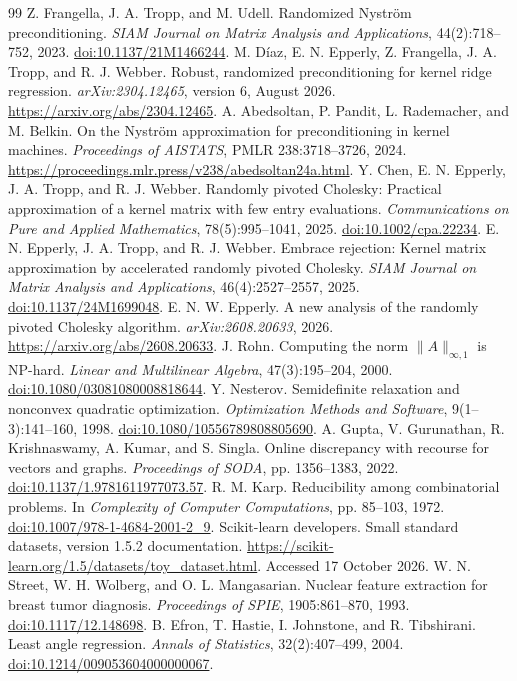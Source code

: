 \documentclass[11pt]{article}
\theoremstyle{definition}\newtheorem{definition}[theorem]{Definition}
\begin{document}
\begin{thebibliography}{99}
 Z. Frangella, J. A. Tropp, and M. Udell. Randomized Nystr\"om preconditioning. \emph{SIAM Journal on Matrix Analysis and Applications}, 44(2):718--752, 2023. \href{https://doi.org/10.1137/21M1466244}{doi:10.1137/21M1466244}.
 M. D\'iaz, E. N. Epperly, Z. Frangella, J. A. Tropp, and R. J. Webber. Robust, randomized preconditioning for kernel ridge regression. \emph{arXiv:2304.12465}, version 6, August 2026. \url{https://arxiv.org/abs/2304.12465}.
 A. Abedsoltan, P. Pandit, L. Rademacher, and M. Belkin. On the Nystr\"om approximation for preconditioning in kernel machines. \emph{Proceedings of AISTATS}, PMLR 238:3718--3726, 2024. \url{https://proceedings.mlr.press/v238/abedsoltan24a.html}.
 Y. Chen, E. N. Epperly, J. A. Tropp, and R. J. Webber. Randomly pivoted Cholesky: Practical approximation of a kernel matrix with few entry evaluations. \emph{Communications on Pure and Applied Mathematics}, 78(5):995--1041, 2025. \href{https://doi.org/10.1002/cpa.22234}{doi:10.1002/cpa.22234}.
 E. N. Epperly, J. A. Tropp, and R. J. Webber. Embrace rejection: Kernel matrix approximation by accelerated randomly pivoted Cholesky. \emph{SIAM Journal on Matrix Analysis and Applications}, 46(4):2527--2557, 2025. \href{https://doi.org/10.1137/24M1699048}{doi:10.1137/24M1699048}.
 E. N. W. Epperly. A new analysis of the randomly pivoted Cholesky algorithm. \emph{arXiv:2608.20633}, 2026. \url{https://arxiv.org/abs/2608.20633}.
 J. Rohn. Computing the norm $\|A\|_{\infty,1}$ is NP-hard. \emph{Linear and Multilinear Algebra}, 47(3):195--204, 2000. \href{https://doi.org/10.1080/03081080008818644}{doi:10.1080/03081080008818644}.
 Y. Nesterov. Semidefinite relaxation and nonconvex quadratic optimization. \emph{Optimization Methods and Software}, 9(1--3):141--160, 1998. \href{https://doi.org/10.1080/10556789808805690}{doi:10.1080/10556789808805690}.
 A. Gupta, V. Gurunathan, R. Krishnaswamy, A. Kumar, and S. Singla. Online discrepancy with recourse for vectors and graphs. \emph{Proceedings of SODA}, pp. 1356--1383, 2022. \href{https://doi.org/10.1137/1.9781611977073.57}{doi:10.1137/1.9781611977073.57}.
 R. M. Karp. Reducibility among combinatorial problems. In \emph{Complexity of Computer Computations}, pp. 85--103, 1972. \href{https://doi.org/10.1007/978-1-4684-2001-2_9}{doi:10.1007/978-1-4684-2001-2\_9}.
 Scikit-learn developers. Small standard datasets, version 1.5.2 documentation. \url{https://scikit-learn.org/1.5/datasets/toy_dataset.html}. Accessed 17 October 2026.
 W. N. Street, W. H. Wolberg, and O. L. Mangasarian. Nuclear feature extraction for breast tumor diagnosis. \emph{Proceedings of SPIE}, 1905:861--870, 1993. \href{https://doi.org/10.1117/12.148698}{doi:10.1117/12.148698}.
 B. Efron, T. Hastie, I. Johnstone, and R. Tibshirani. Least angle regression. \emph{Annals of Statistics}, 32(2):407--499, 2004. \href{https://doi.org/10.1214/009053604000000067}{doi:10.1214/009053604000000067}.
\end{thebibliography}
\end{document}
